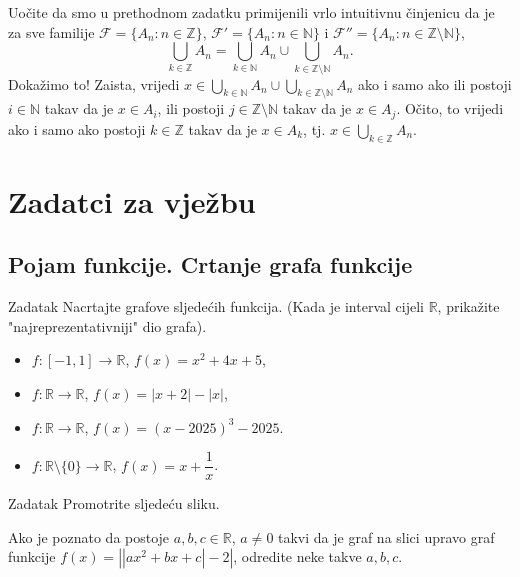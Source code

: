 \begin{remark}
Uočite da smo u prethodnom zadatku primijenili vrlo intuitivnu činjenicu da je za sve familije \(\mathcal{F}=\{A_n : n\in \mathbb{Z}\}\), \(\mathcal{F}'=\{A_n : n\in \mathbb{N}\}\) i \(\mathcal{F}''=\{A_n : n\in \mathbb{Z}\setminus\mathbb{N}\}\),
\[\bigcup_{k\in \mathbb{Z}}{A_n}=\bigcup_{k\in \mathbb{N}}{A_n}\cup \bigcup_{k\in \mathbb{Z}\setminus\mathbb{N}}{A_n}.\]
Dokažimo to! Zaista, vrijedi \(\displaystyle x\in \bigcup_{k\in \mathbb{N}}{A_n}\cup \bigcup_{k\in \mathbb{Z}\setminus\mathbb{N}}{A_n}\) ako i samo ako ili postoji \(i\in \mathbb{N}\) takav da je \(x\in A_i\), ili postoji \(j\in \mathbb{Z}\setminus\mathbb{N}\) takav da je \(x\in A_j\). Očito, to vrijedi ako i samo ako postoji \(k\in \mathbb{Z}\) takav da je \(x\in A_k\), tj. \(\displaystyle x\in \bigcup_{k\in \mathbb{Z}}{A_n}\).
\end{remark}
\newpage
\section*{Zadatci za vježbu}
\subsection*{Pojam funkcije. Crtanje grafa funkcije}
\begin{exercise}{Zadatak}
Nacrtajte grafove sljedećih funkcija. (Kada je interval cijeli \(\mathbb{R}\), prikažite "najreprezentativniji" dio grafa). 
\begin{itemize}
\item[a)] \(f : [-1, 1]\to \mathbb{R}\), \(f(x)=x^2+4x+5\),
\item[b)] \(f : \mathbb{R}\to \mathbb{R}\), \(f(x)=|x+2|-|x|\),
\item[c)] \(f : \mathbb{R}\to \mathbb{R}\), \(f(x)=(x-2025)^3-2025\).
\item[d)] \(f : \mathbb{R}\setminus\{0\}\to \mathbb{R}\), \(f(x)=x+\dfrac{1}{x}\).
\end{itemize}
\end{exercise}
\begin{exercise}{Zadatak} Promotrite sljedeću sliku.
\begin{figure}[ht]
\begin{center}
\end{center}
\end{figure}

Ako je poznato da postoje \(a, b, c\in \mathbb{R}\), \(a\neq 0\) takvi da je graf na slici upravo graf funkcije \(f(x)=\left\lvert\left\lvert ax^2+bx+c\right\rvert-2\right\rvert\), odredite neke takve \(a, b, c\).
\end{exercise}
